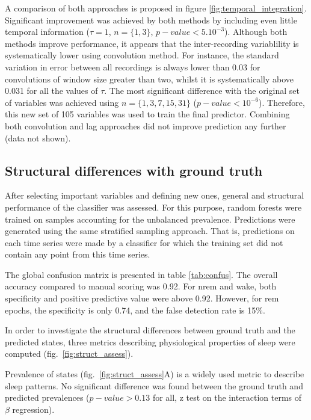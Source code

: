 A comparison of both approaches is proposed in figure \ref{fig:temporal_integration}.
Significant improvement was achieved by both methods by including even little temporal information ($\tau = 1$, $n=\{1,3\}$, $p-value < 5.10^{-3}$).
Although both methods improve performance, it appears that the inter-recording variablility is systematically lower using convolution method.
For instance, the standard variation in error between all recordings is always lower than 0.03 for convolutions of window size greater than two,
whilst it is systematically above 0.031 for all the values of $\tau$.
The most significant difference with the original set of variables was achieved using $n = \{1,3,7,15,31\}$ ($p-value < 10^{-6}$).
Therefore, this new set of 105 variables was used to train the final predictor.
Combining both convolution and lag approaches did not improve prediction any further (data not shown).




\subsection{Structural differences with ground truth}



After selecting important variables and defining new ones, general and structural performance of the classifier was assessed.
For this purpose, random forests were trained on samples accounting for the unbalanced prevalence.
Predictions were generated using the same stratified sampling approach.
That is, predictions on each time series were made by a classifier for which
the training set did not contain any point from this time series.




The global confusion matrix is presented in table \ref{tab:confus}. The overall accuracy compared to manual scoring was 0.92.
For \gls{nrem} and wake, both specificity and positive predictive value were above 0.92. However,
for \gls{rem} epochs, the specificity is only 0.74, and the false detection rate is 15\%.

In order to investigate the structural differences between ground truth and the predicted states,
three metrics describing physiological properties of sleep were computed (fig.~\ref{fig:struct_assess}).

Prevalence of states (fig.~\ref{fig:struct_assess}A) is a widely used metric to
describe sleep patterns.
No significant difference was found between the ground truth and predicted prevalences ($p-value > 0.13$ for all, z test on the interaction terms of $\beta$ regression).

